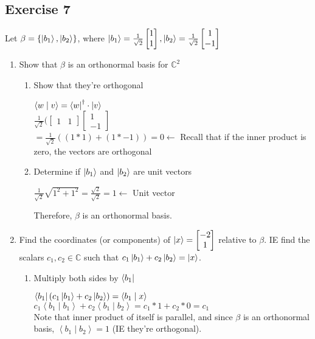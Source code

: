 \documentclass[12pt]{article}
\theoremstyle{plain}
\theoremstyle{nonumberplain}
\theoremstyle{plain}
\theoremstyle{nonumberplain}
\newcommand\1{{\bf 1}}
\newcommand{\bmat}[1]{\begin{bmatrix*} #1 \end{bmatrix*}} %
\newcommand{\C}{\mathbb{C}} %
\newcommand{\<}{\left\langle}
\renewcommand{\>}{\right\rangle}
\newcommand{\inp}[2]{\left\langle#1\mid #2\right\rangle} %
\begin{document}

\subsection{Exercise 7}
Let $\beta=\lbrace\ket{b_1},\ket{b_2}\rbrace$, where $\ket{b_1}=\frac{1}{\sqrt{2}}\bmat{1 \\ 1}, \ket{b_2}=\frac{1}{\sqrt{2}}\bmat{1 \\ -1}$
\begin{enumerate}[label=(\alph*)]
	\item Show that $\beta$ is an orthonormal basis for $\C^2$ \\
	\begin{enumerate}[label=(\roman*)]
		\item Show that they're orthogonal
		\begin{center}
		$\inp{w}{v}=\bra{w}^\dagger\cdot\ket{v}$ \\
		$\frac{1}{\sqrt{2}}(\bmat{1 & 1}\bmat{1 \\ -1}$ \\
		$=\frac{1}{\sqrt{2}}((1*1)+(1*-1))=0\longleftarrow$ Recall that if the inner product is zero, the vectors are orthogonal
		\end{center}
		\item Determine if $\ket{b_1}$ and $\ket{b_2}$ are unit vectors
		\begin{center}
		\indent $\frac{1}{\sqrt{2}}\sqrt{1^2+1^2}=\frac{\sqrt{2}}{\sqrt{2}}=1\longleftarrow$ Unit vector
		\end{center}
		Therefore, $\beta$ is an orthonormal basis.
	\end{enumerate}
	\item Find the coordinates (or components) of $\ket{x}=\bmat{-2 \\ 1}$ relative to $\beta$. IE find the scalars $c_1, c_2 \in \C$ such that $c_1\ket{b_1}+c_2\ket{b_2}=\ket{x}$.
	\begin{enumerate}[label=(\roman*)]
		\item Multiply both sides by $\bra{b_1}$
		\begin{center}
		$\bra{b_1}(c_1\ket{b_1}+c_2\ket{b_2})=\inp{b_1}{x}$ \\
		$c_1\inp{b_1}{b_1}+c_2\inp{b_1}{b_2} = c_1*1+c_2*0=c_1$ \\ 
		Note that inner product of itself is parallel, and since $\beta$ is an orthonormal basis, $\inp{b_1}{b_2}=1$ (IE they're orthogonal). \\

\end{center}
\end{enumerate}
\end{enumerate}
\end{document}
